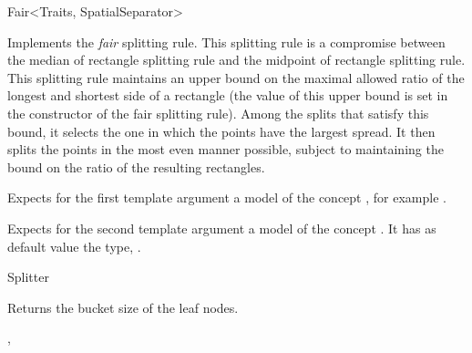 

\begin{ccRefFunctionObjectClass}{Fair<Traits, SpatialSeparator>}  %


\ccDefinition
Implements the {\em fair} splitting rule.  
This splitting rule is a compromise between the median of rectangle
splitting rule and the midpoint of rectangle splitting rule. This
splitting rule maintains an upper bound on the maximal allowed ratio
of the longest and shortest side of a rectangle (the value of this
upper bound is set in the constructor of the fair splitting
rule). Among the splits that satisfy this bound, it selects the one in
which the points have the largest spread.  It then splits the points
in the most even manner possible, subject to maintaining the bound on
the ratio of the resulting rectangles.


\ccParameters

Expects for the first template argument a model of
the concept , 
for example . 

Expects for the second template argument a model of the concept . 
It has as default value the type, .



\ccIsModel

Splitter

\ccTypes


\ccCreation
{}  %


\ccOperations



 {Returns the bucket size of the leaf nodes.}


\ccSeeAlso

,\\

\end{ccRefFunctionObjectClass}


